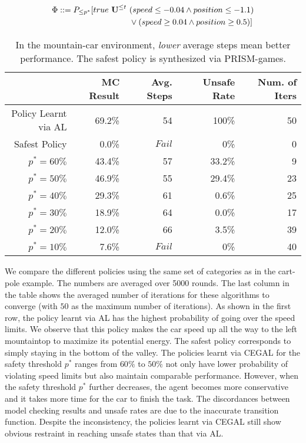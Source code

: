 {{%
\begin{equation}
\begin{split}
\Phi ::= P_{\leq p^*}[true\ {\textbf{U}}^{\leq t}\ &(speed\leq -0.04\wedge position\leq-1.1)\\
&\vee(speed\geq 0.04\wedge position\geq0.5)]
\end{split}
\label{eq:spec2}
\end{equation}
\begin{table}[hbt]
\caption{In the mountain-car environment, {\it lower} average steps mean better performance. The safest policy is synthesized via PRISM-games.}
\begin{tabular}{|r|r|r|r|r|}
\hline 
\small{}  &\small{\ \ MC Result} &\small{\ \ Avg. Steps}  &\small{\ \ Unsafe Rate}&\small{\ \ Num. of Iters} \\ 
\hline \small
Policy Learnt via AL & 69.2\%& 54 & 100\% & 50\\
\hline
Safest Policy &  0.0\% &  $Fail$ & 0\% & 0\\
\hline
$p^*=60\%$&43.4\% & 57 & 33.2\% & 9\\
\hline
$p^*=50\%$ &46.9\%& 55 & 29.4\% & 23\\
\hline
$p^*=40\%$ &29.3\% & 61 & 0.6\% & 25\\
\hline
$p^*=30\%$ &18.9\% & 64 & 0.0\% & 17\\
\hline
$p^*=20\%$ &12.0\% & 66 & 3.5\% & 39\\
\hline
$p^*=10\%$ &7.6\% & $Fail$ & 0\%  & 40\\
\hline
\end{tabular}
\label{tab:mountaincar0}
\end{table}

 We compare the different policies using the same set of categories as in the cart-pole example. The numbers are averaged over 5000 rounds. The last column in the table shows the averaged number of iterations for these algorithms to converge (with $50$ as the maximum number of iterations).
As shown in the first row, the policy learnt via AL has the highest probability of going over the speed limits. We observe that this policy makes the car speed up all the way to the left mountaintop to maximize its potential energy. The safest policy corresponds to simply staying in the bottom of the valley. 
The policies learnt via CEGAL for the safety threshold $p^*$ ranges from $60\%$ to $50\%$ not only have lower probability of violating speed limits but also maintain comparable performance. However, when the safety threshold $p^*$ further decreases, the agent becomes more conservative and it takes more time for the car to finish the task. The discordances between model checking results and unsafe rates are due to the inaccurate transition function. Despite the inconsistency, the policies learnt via CEGAL still show obvious restraint in reaching unsafe states than that via AL.

}}
